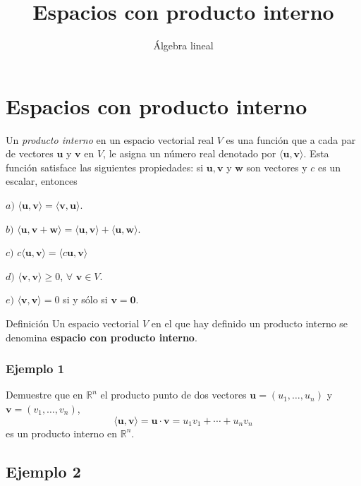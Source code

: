 \documentclass[
]{article}
\title{Espacios con producto interno}
\author{Álgebra lineal}
\date{}
\begin{document}
\maketitle

\hypertarget{espacios-con-producto-interno}{%
\section{Espacios con producto
interno}\label{espacios-con-producto-interno}}

Un \textit{producto interno} en un espacio vectorial real \(V\) es una
función que a cada par de vectores \(\mathbf{u}\) y \(\mathbf{v}\) en
\(V\), le asigna un número real denotado por
\(\langle \mathbf{u}, \mathbf{v}\rangle\). Esta función satisface las
siguientes propiedades: si \(\mathbf{u}, \mathbf{v}\) y \(\mathbf{w}\)
son vectores y \(c\) es un escalar, entonces

\(a)\)
\(\langle \mathbf{u}, \mathbf{v}\rangle = \langle \mathbf{v}, \mathbf{u}\rangle\).

\(b)\)
\(\langle \mathbf{u}, \mathbf{v}+\mathbf{w}\rangle  = \langle \mathbf{u}, \mathbf{v}\rangle + \langle \mathbf{u}, \mathbf{w}\rangle\).

\(c)\)
\(c\langle \mathbf{u}, \mathbf{v}\rangle = \langle c\mathbf{u}, \mathbf{v}\rangle\)

\(d)\) \(\langle \mathbf{v}, \mathbf{v}\rangle \geq 0\),
\(\forall\,\, \mathbf{v}\in V\).

\(e)\) \(\langle \mathbf{v}, \mathbf{v}\rangle = 0\) si y sólo si
\(\mathbf{v}=\mathbf{0}\).

Definición Un espacio vectorial \(V\) en el que hay definido un producto
interno se denomina \textbf{espacio con producto interno}.

\hypertarget{ejemplo-1}{%
\subsubsection{Ejemplo 1}\label{ejemplo-1}}

Demuestre que en \(\mathbb{R}^n\) el producto punto de dos vectores
\(\mathbf{u}=(u_1,\ldots,u_n)\) y \(\mathbf{v}=(v_1,\ldots,v_n)\), \[
        \langle \mathbf{u}, \mathbf{v}\rangle = \mathbf{u}\cdot \mathbf{v} = u_1v_1 + \cdots + u_nv_n
\] es un producto interno en \(\mathbb{R}^n\).

\hypertarget{ejemplo-2}{%
\subsection{Ejemplo 2}\label{ejemplo-2}}
\end{document}
